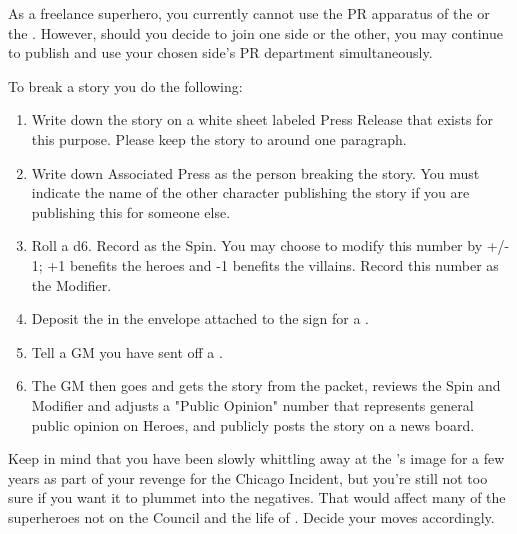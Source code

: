 \documentclass[green]{LRSguildcamp1}
\begin{document}
As a freelance superhero, you currently cannot use the PR apparatus of the \cHeroLeague{} or the \cVillainCompact{}. However, should you decide to join one side or the other, you may continue to publish and use your chosen side's PR department simultaneously.  

To break a story you do the following:
\begin{enumerate}

\item Write down the story on a white sheet labeled Press Release that exists for this purpose. Please keep the story to around one paragraph. 

\item Write down Associated Press as the person breaking the story. You must indicate the name of the other character publishing the story if you are publishing this for someone else. 

\item Roll a d6. Record as the Spin. You may choose to modify this number by +/- 1; +1 benefits the heroes and -1 benefits the villains. Record this number as the Modifier. 

\item Deposit the \wPressRelease{} in the envelope attached to the sign for a \sWallPhone{}. 

\item Tell a GM you have sent off a \wPressRelease{}.

\item The GM then goes and gets the story from the packet, reviews the Spin and Modifier and adjusts a "Public Opinion" number that represents general public opinion on Heroes, and publicly posts the story on a news board. 

\end{enumerate}


Keep in mind that you have been slowly whittling away at the \cHeroLeague{}'s image for a few years as part of your revenge for the Chicago Incident, but you're still not too sure if you want it to plummet into the negatives. That would affect many of the superheroes not on the Council and the life of \cYoungest{}.  Decide your moves accordingly.
\end{document}
